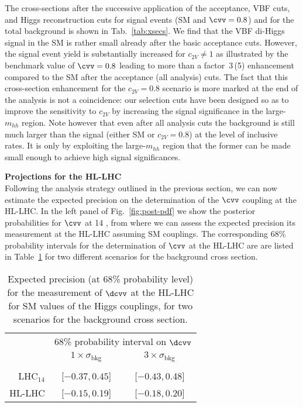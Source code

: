 The cross-sections after the
successive application of the acceptance, VBF cuts, and Higgs reconstruction cuts
for signal events (SM and  $\cvv=0.8$) and for
the total background is shown in Tab.~\ref{tab:xsecs}. We find that the VBF di-Higgs signal in the SM is rather small
already after the basic acceptance cuts. However, the signal event
yield is substantially increased for $c_{2V}\ne 1$ as illustrated by the
benchmark value of $\cvv = 0.8$ leading to more than a factor~3\,(5) enhancement
compared to the SM after the acceptance (all analysis) cuts. The fact that this
cross-section enhancement for the $c_{2V} = 0.8$ scenario is more marked at the
end of the analysis is not a coincidence: our selection cuts have been designed
so as to improve the sensitivity to $c_{2V}$ by increasing the signal
significance in the large-$m_{hh}$ region.
Note however that even after
all analysis cuts the background is still much larger than the signal (either SM
or $c_{2V}=0.8$) at the level of inclusive rates. It is only by exploiting  the
large-$m_{hh}$ region that the former can be made small enough to achieve high
signal significances.

\noindent
{\bf Projections for the HL-LHC}\\
Following the analysis strategy outlined in the previous section,
we can now estimate the expected precision on the 
determination of the $\cvv$ coupling at the HL-LHC.
%
In the left panel of Fig.~\ref{fig:post-pdf} we show the
posterior probabilities for $\cvv$ at 14 \UTeV,
from where we can assess the expected precision  
its measurement at the HL-LHC assuming SM couplings.
The corresponding 68\% probability intervals for the determination of $\cvv$ at the HL-LHC 
are are listed in Table~\ref{tab:resultsdcvv} for two different 
scenarios for the background cross section.
\begin{table}[h!]
	\begin{center}
		\begin{tabular}{r|@{\hskip 0.15in}c @{\hskip 0.2in}c}
			\toprule[1pt]
			&\multicolumn{2}{c}{68\% probability interval on $\dcvv$}\\[0.1cm]
			& $1\times\sigma_\text{bkg}$&
			$3\times\sigma_\text{bkg}$ \\[0.1cm]
			\hline
			& & \\[-0.3cm]
			LHC$_{14}$ & [$-0.37$,\,$0.45$] & [$-0.43$,\,0.48] \\[0.2cm]
			HL-LHC & [$-0.15$,\,0.19] & [$-0.18$,\,0.20]\\[0.2cm]
			\bottomrule[1pt]
		\end{tabular}
	\end{center}
	\vspace{-0.3cm}
	\caption{\small Expected precision (at 68\% probability level) for
		the measurement of $\dcvv$ at the HL-LHC for
		SM values of the Higgs couplings, for two scenarios for the background cross section.
		\label{tab:resultsdcvv}
	}
\end{table}

